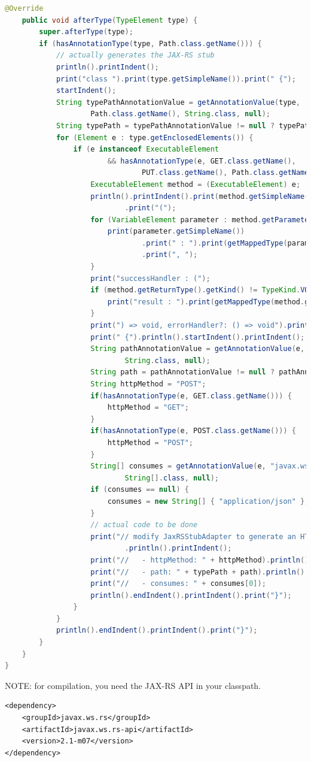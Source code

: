 \documentclass[a4paper]{report}
\begin{document}
\begin{lstlisting}[language=Java]
	@Override
	public void afterType(TypeElement type) {
		super.afterType(type);
		if (hasAnnotationType(type, Path.class.getName())) {
			// actually generates the JAX-RS stub
			println().printIndent();
			print("class ").print(type.getSimpleName()).print(" {");
			startIndent();
			String typePathAnnotationValue = getAnnotationValue(type, 
					Path.class.getName(), String.class, null);
			String typePath = typePathAnnotationValue != null ? typePathAnnotationValue : "";
			for (Element e : type.getEnclosedElements()) {
				if (e instanceof ExecutableElement
						&& hasAnnotationType(e, GET.class.getName(), 
								PUT.class.getName(), Path.class.getName())) {
					ExecutableElement method = (ExecutableElement) e;
					println().printIndent().print(method.getSimpleName().toString())
							.print("(");
					for (VariableElement parameter : method.getParameters()) {
						print(parameter.getSimpleName())
								.print(" : ").print(getMappedType(parameter.asType()))
								.print(", ");
					}
					print("successHandler : (");
					if (method.getReturnType().getKind() != TypeKind.VOID) {
						print("result : ").print(getMappedType(method.getReturnType()));
					}
					print(") => void, errorHandler?: () => void").print(") : void");
					print(" {").println().startIndent().printIndent();
					String pathAnnotationValue = getAnnotationValue(e, Path.class.getName(), 
							String.class, null);
					String path = pathAnnotationValue != null ? pathAnnotationValue : "";
					String httpMethod = "POST";
					if(hasAnnotationType(e, GET.class.getName())) {
						httpMethod = "GET";
					}
					if(hasAnnotationType(e, POST.class.getName())) {
						httpMethod = "POST";
					}
					String[] consumes = getAnnotationValue(e, "javax.ws.rs.Consumes", 
							String[].class, null);
					if (consumes == null) {
						consumes = new String[] { "application/json" };
					}
					// actual code to be done
					print("// modify JaxRSStubAdapter to generate an HTTP invocation here")
							.println().printIndent();
					print("//   - httpMethod: " + httpMethod).println().printIndent();
					print("//   - path: " + typePath + path).println().printIndent();
					print("//   - consumes: " + consumes[0]);
					println().endIndent().printIndent().print("}");
				}
			}
			println().endIndent().printIndent().print("}");
		}
	}
}
\end{lstlisting}

NOTE: for compilation, you need the JAX-RS API in your classpath.

\begin{lstlisting}
<dependency>
	<groupId>javax.ws.rs</groupId>
	<artifactId>javax.ws.rs-api</artifactId>
	<version>2.1-m07</version>
</dependency>
\end{lstlisting}
\end{document}
